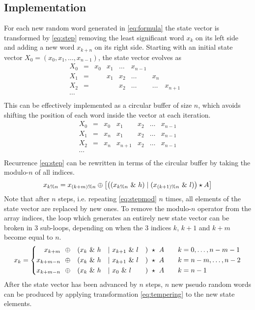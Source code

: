 \documentclass[preprint,1p,times]{elsarticle}
\begin{document}
	\subsection{Implementation}
	For each new random word generated in \eqref{eq:formula} the state vector is transformed by \eqref{eq:step} removing the least significant word $x_{k}$ on its left side and adding a new word $x_{k+n}$ on its right side. Starting with an initial state vector $X_0=(x_0, x_1, \dots, x_{n-1})$, the state vector evolves as
	$$
	\begin{matrix}
		X_0 &=& x_0 & x_1 & \dots & x_{n-1} &\\
		X_1 &=& & x_1 & x_2 & \dots & x_{n} & \\
		X_2 &=& & & x_2 & \dots & \dots & x_{n+1} &\\
		\cdots \\
	\end{matrix}
	$$
	This can be effectively implemented as a circular buffer of size $n$, which avoids shifting the position of each word inside the vector at each iteration.
	\begin{equation}
		\label{eq:staterec}
		\begin{matrix}
			X_0 &=& x_0 & x_1 & x_2 & \dots & x_{n-1} \\
			X_1 &=& x_{n} & x_1 & x_2 & \dots & x_{n-1} \\
			X_2 &=& x_{n} & x_{n+1} & x_2 & \dots & x_{n-1} \\
			\cdots \\
		\end{matrix}
	\end{equation}
	Recurrence \eqref{eq:step} can be rewritten in terms of the circular buffer by taking the modulo-$n$ of all indices.
	\begin{equation}
		\label{eq:stepmod}
		x_{k\%n} = x_{(k+m)\% n} \mathbin{\oplus} \left[ \left(({x_{k\%n}}~\&~h) \mid (x_{(k+1)\%n}~\&~l)\right) \star A \right]
	\end{equation}
	Note that after $n$ steps, i.e. repeating \eqref{eq:stepmod} $n$ times, all elements of the state vector are replaced by new ones. To remove the modulo-$n$ operator from the array indices, the loop which generates an entirely new state vector can be broken in 3 sub-loops, depending on when the 3 indices $k$, $k+1$ and $k+m$ become equal to $n$.
	\begin{equation}
		\label{eq:stepnomod}
		x_k = \left\{
		\begin{aligned}
			x_{k+m}   & ~~\mathbin{\oplus} & ( & x_{k} ~\&~ h & \mid~ & x_{k+1} ~\&~ l & ) &~\star~ A &\quad &k = 0, \dots, n-m-1\\
			x_{k+m-n} & ~~\mathbin{\oplus} & ( & x_{k} ~\&~ h & \mid~ & x_{k+1} ~\&~ l & ) &~\star~ A &\quad &k = n-m, \dots, n-2 \\
			x_{k+m-n} & ~~\mathbin{\oplus} & ( & x_{k} ~\&~ h & \mid~ & x_{0}   ~\&~ l & ) &~\star~ A &\quad &k = n-1
		\end{aligned}
		\right.
	\end{equation}
	After the state vector has been advanced by $n$ steps, $n$ new pseudo random words can be produced by applying transformation \eqref{eq:tempering} to the new state elements.
	
\end{document}
